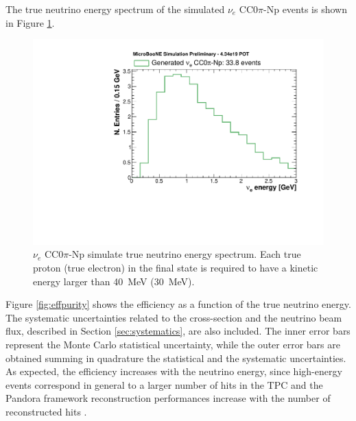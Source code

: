The true neutrino energy spectrum of the simulated $\nu_{e}$ CC$0\pi$-Np events is shown in Figure \ref{fig:true_energy}.

\begin{figure}
\centering
  \includegraphics[width=0.8\linewidth]{figures/tot.pdf}
  \caption{$\nu_{e}$ CC$0\pi$-Np simulate true neutrino energy spectrum. Each true proton (true electron) in the final state is required to have a kinetic energy larger than 40~MeV (30~MeV).}
  \label{fig:true_energy}
\end{figure}

Figure \ref{fig:effpurity} shows the efficiency as a function of the true neutrino energy.
The systematic uncertainties related to the cross-section and the neutrino beam flux, described in Section \ref{sec:systematics}, are also included. The inner error bars represent the Monte Carlo statistical uncertainty, while the outer error bars are obtained summing in quadrature the statistical and the systematic uncertainties. 
As expected, the efficiency increases with the neutrino energy, since high-energy events correspond in general to a larger number of hits in the TPC and the Pandora framework reconstruction performances increase with the number of reconstructed hits \cite{Acciarri:2017hat}. 



